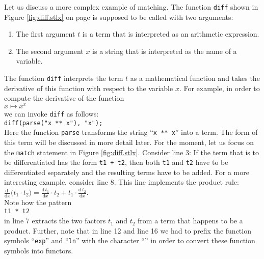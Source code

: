 Let us discuss a more complex example of matching.  The function \texttt{diff} shown in Figure
\ref{fig:diff.stlx} on page \pageref{fig:diff.stlx} is supposed to be called with two arguments:
\begin{enumerate}
\item The first argument $t$ is a term that is interpreted as an arithmetic expression.
\item The second argument $x$ is a string that is interpreted as  the name of a variable.
\end{enumerate}
The function \texttt{diff} interprets the term $t$ as a mathematical function and takes the
derivative of this function with respect to the variable $x$.  For example, in order to compute the
derivative of the function 
\\[0.2cm]
\hspace*{1.3cm}
$x \mapsto x^x$
\\[0.2cm]
we can invoke \texttt{diff} as follows:
\\[0.2cm]
\hspace*{1.3cm}
\texttt{diff(parse("x ** x"), "x");}
\\[0.2cm]
Here the function \texttt{parse} transforms the string ``\texttt{x ** x}'' into a term.  The form of
this term will be discussed in more detail later.  For the moment, let us focus on the
\texttt{match} statement in Figure
\ref{fig:diff.stlx}.  Consider line 3: If the term that is to be differentiated has the form
\texttt{t1 + t2}, then both \texttt{t1} and \texttt{t2} have to be differentiated separately and the
resulting terms have to be added.  For a more interesting example, consider line 8.  This line
implements the product rule:
\\[0.2cm]
\hspace*{1.3cm}
$\displaystyle\frac{\mathrm{d}\;}{\mathrm{d}x} \bigl(t_1 \cdot t_2\bigr) = 
 \frac{\mathrm{d}\, t_1}{\mathrm{d}x} \cdot t_2 + t_1 \cdot \frac{\mathrm{d}\,t_2}{\mathrm{d}x}
$.
\\[0.2cm]
Note how the pattern 
\\[0.2cm]
\hspace*{1.3cm}
\texttt{t1 * t2}
\\[0.2cm]
in line 7 extracts the two factors $t_1$ and $t_2$ from a term that happens to be a product.
Further, note that in line 12 and line 16 we had to prefix the function symbols ``\texttt{exp}'' and
``\texttt{ln}'' with the character ``\texttt{}'' in order to convert these function
symbols into functors. 


